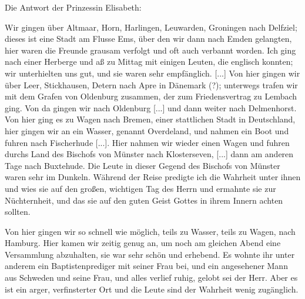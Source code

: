 Die Antwort der Prinzessin Elisabeth:


Wir gingen über Altmaar, Horn, Harlingen, Leuwarden, Groningen 
nach Delfziel; dieses ist eine Stadt am Flusse Ems, über
den wir dann nach Emden gelangten, hier waren die Freunde
grausam verfolgt und oft auch verbannt worden. Ich ging nach
einer Herberge und aß zu Mittag mit einigen Leuten, die englisch
konnten; wir unterhielten uns gut, und sie waren sehr empfänglich. 
[...] Von hier gingen wir über Leer, Stickhausen, Detern
nach Apre in Dänemark (?); unterwegs trafen wir mit dem
Grafen von Oldenburg zusammen, 
der zum Friedensvertrag zu
Lembach ging. Von da gingen wir nach 
Oldenburg [...] und
dann weiter nach Delmenhorst. Von hier ging es zu Wagen nach
Bremen, einer stattlichen Stadt in Deutschland, hier gingen wir
an ein Wasser, genannt Overdeland, und nahmen ein Boot und
fuhren nach Fischerhude [...]. Hier nahmen wir wieder einen
Wagen und fuhren durchs Land des Bischofs von Münster 
nach Klosterseven, [...] dann am anderen Tage nach Buxtehude.
Die Leute in dieser Gegend des Bischofs von Münster waren
sehr im Dunkeln. Während der Reise predigte ich die Wahrheit
unter ihnen und wies sie auf den großen, wichtigen Tag des
Herrn und ermahnte sie zur Nüchternheit, und das sie auf den
guten Geist Gottes in ihrem Innern achten sollten.

Von hier gingen wir so schnell wie möglich, teils zu Wasser,
teils zu Wagen, nach Hamburg. Hier kamen wir zeitig genug an,
um noch am gleichen Abend eine Versammlung abzuhalten, sie
war sehr schön und erhebend. Es wohnte ihr unter anderem ein
Baptistenprediger mit seiner Frau bei, und ein angesehener Mann
aus Schweden und seine Frau, und alles verlief ruhig, gelobt sei
der Herr. Aber es ist ein arger, verfinsterter Ort und die Leute
sind der Wahrheit wenig zugänglich.

